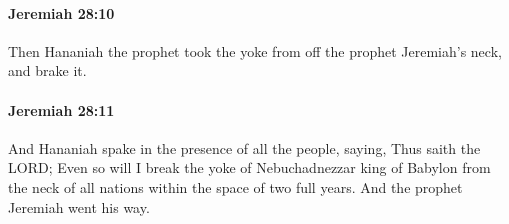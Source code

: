 		\paragraph{Jeremiah 28:10} %
			\label{JEREMIAH-28-10}

			Then Hananiah the prophet took the yoke from off the prophet Jeremiah’s neck, and brake it.


		\paragraph{Jeremiah 28:11} %
			\label{JEREMIAH-28-11}

			And Hananiah spake in the presence of all the people, saying, Thus saith the LORD; Even so will I break the yoke of Nebuchadnezzar king of Babylon from the neck of all nations within the space of two full years. And the prophet Jeremiah went his way.


